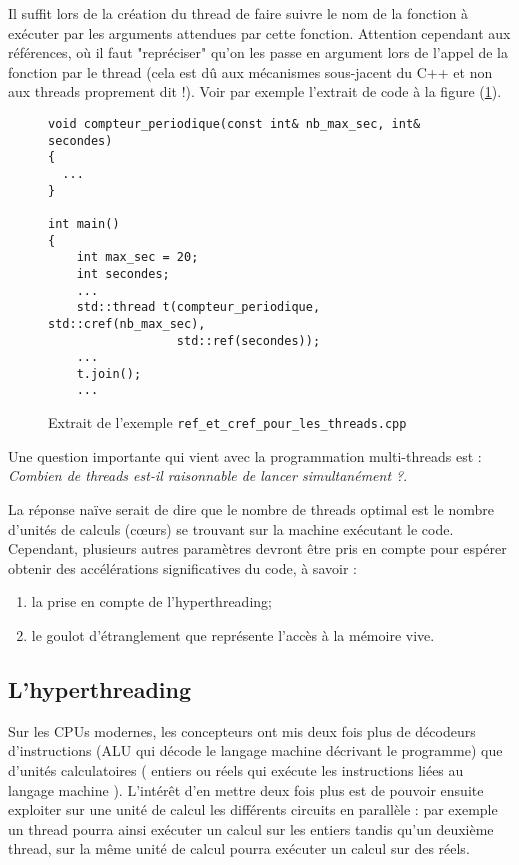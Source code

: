 \documentclass[fleqn,11pt]{article}
\begin{document}
Il suffit lors de la création du thread de faire suivre le nom de la fonction à exécuter par les arguments
attendues par cette fonction. Attention cependant aux références, où il faut "repréciser" qu'on les passe
en argument lors de l'appel de la fonction par le thread (cela est dû aux mécanismes sous-jacent du C++
et non aux threads proprement dit !). Voir par exemple l'extrait de code à la figure (\ref{lst::ref_et_cref}).

\begin{figure}[ht]
\begin{lstlisting}
void compteur_periodique(const int& nb_max_sec, int& secondes)
{
  ...
}

int main()
{
    int max_sec = 20;
    int secondes;
    ...
    std::thread t(compteur_periodique, std::cref(nb_max_sec), 
                  std::ref(secondes));
    ...
    t.join();
    ...
\end{lstlisting}
\caption{Extrait de l'exemple \texttt{ref\_et\_cref\_pour\_les\_threads.cpp}}
\label{lst::ref_et_cref}
\end{figure}

Une question importante qui vient avec la programmation multi-threads est : \textsl{Combien de threads est-il raisonnable de lancer simultanément ?}.

La réponse naïve serait de dire que le nombre de threads optimal est le nombre d'unités de calculs (c{\oe}urs) se trouvant sur la machine exécutant le code. Cependant, plusieurs autres paramètres devront être pris en compte pour espérer obtenir des accélérations significatives du code, à savoir :
\begin{enumerate}
  \item la prise en compte de l'hyperthreading;
  \item le goulot d'étranglement que représente l'accès à la mémoire vive.
\end{enumerate}

\subsection{L'hyperthreading}


Sur les CPUs modernes, les concepteurs ont mis deux fois plus de décodeurs d'instructions
(ALU qui décode le langage machine décrivant le programme) que d'unités calculatoires ( entiers ou réels qui exécute les instructions liées au langage machine ). L'intérêt d'en mettre deux fois plus est
de pouvoir ensuite exploiter sur une unité de calcul les différents circuits en parallèle : par exemple
un thread pourra ainsi exécuter un calcul sur les entiers tandis qu'un deuxième thread, sur la même unité
de calcul pourra exécuter un calcul sur des réels.
\end{document}
